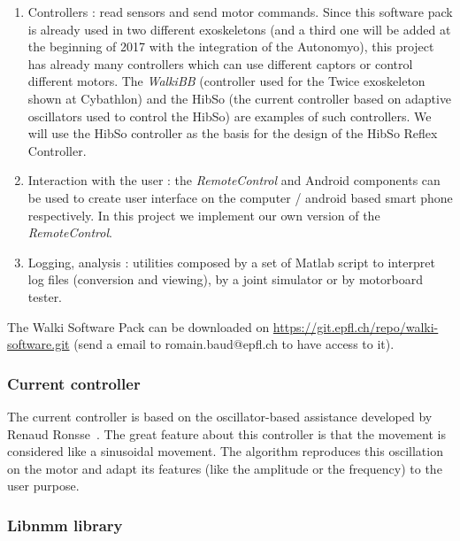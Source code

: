 \documentclass[a4paper,12pt]{article}
\begin{document}
\begin{enumerate}
 	\item Controllers : read sensors and send motor commands. Since this software pack is already used in two different exoskeletons (and a third one will be added at the beginning of 2017 with the integration of the Autonomyo), this project has already many controllers which can use different captors or control different motors. The \textit{WalkiBB} (controller used for the Twice exoskeleton shown at Cybathlon) and the HibSo (the current controller based on adaptive oscillators used to control the HibSo) are examples of such controllers. We will use the HibSo controller as the basis for the design of the HibSo Reflex Controller. 
	\item Interaction with the user : the \textit{RemoteControl} and Android components can be used to create user interface on the computer / android based smart phone respectively. In this project we implement our own version of the \textit{RemoteControl}.
	\item Logging, analysis : utilities composed by a set of Matlab script to interpret log files (conversion and viewing), by a joint simulator or by motorboard tester. 
\end{enumerate}

The Walki Software Pack can be downloaded on \url{https://git.epfl.ch/repo/walki-software.git} (send a email to romain.baud@epfl.ch to have access to it).

\subsubsection{Current controller}
\label{actualcontroller}
The current controller is based on the oscillator-based assistance developed by Renaud Ronsse~\cite{ronsse2011oscillator}.  The great feature about this controller is that the movement is considered like a sinusoidal movement. The algorithm reproduces this oscillation on the motor and adapt its features (like the amplitude or the frequency) to the user purpose.


\subsubsection{Libnmm library}
\end{document}
